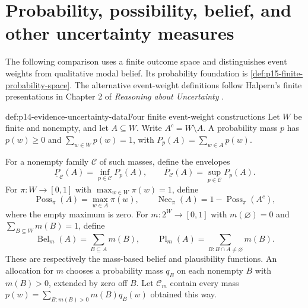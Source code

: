 \section{Probability, possibility, belief, and other uncertainty measures}
\label{sec:p14-evidence-uncertainty}

The following comparison uses a finite outcome space and distinguishes
event weights from qualitative modal belief. Its probability foundation is
\cref{def:p15-finite-probability-space}. The alternative event-weight
definitions follow Halpern's finite presentations in Chapter 2 of
\emph{Reasoning about Uncertainty}
\cite[secs.~2.3--2.5]{HalpernUncertaintyChapter2Extract}.

\begin{hbdefinition}{def:p14-evidence-uncertainty-data}{Four finite event-weight constructions}
Let \(W\) be finite and nonempty, and let \(A\subseteq W\).
Write \(A^c=W\setminus A\). A probability mass \(p\) has
\(p(w)\geq0\) and \(\sum_{w\in W}p(w)=1\), with
\(P_p(A)=\sum_{w\in A}p(w)\).

For a nonempty family \(\mathcal C\) of such masses, define the envelopes
\[
 \underline P_{\mathcal C}(A)=\inf_{p\in\mathcal C}P_p(A),\qquad
 \overline P_{\mathcal C}(A)=\sup_{p\in\mathcal C}P_p(A).
\]
For \(\pi:W\to[0,1]\) with \(\max_{w\in W}\pi(w)=1\), define
\[
 \operatorname{Poss}_{\pi}(A)=\max_{w\in A}\pi(w),\qquad
 \operatorname{Nec}_{\pi}(A)=1-\operatorname{Poss}_{\pi}(A^c),
\]
where the empty maximum is zero.
For \(m:2^W\to[0,1]\) with \(m(\varnothing)=0\) and
\(\sum_{B\subseteq W}m(B)=1\), define
\[
 \operatorname{Bel}_m(A)=\sum_{B\subseteq A}m(B),\qquad
 \operatorname{Pl}_m(A)=\sum_{B:B\cap A\ne\varnothing}m(B).
\]
These are respectively the mass-based belief and plausibility functions.
An allocation for \(m\) chooses a probability mass \(q_B\) on each
nonempty \(B\) with \(m(B)>0\), extended by zero off \(B\).
Let \(\mathcal C_m\) contain every mass
\(p(w)=\sum_{B:m(B)>0}m(B)q_B(w)\) obtained this way.
\end{hbdefinition}

